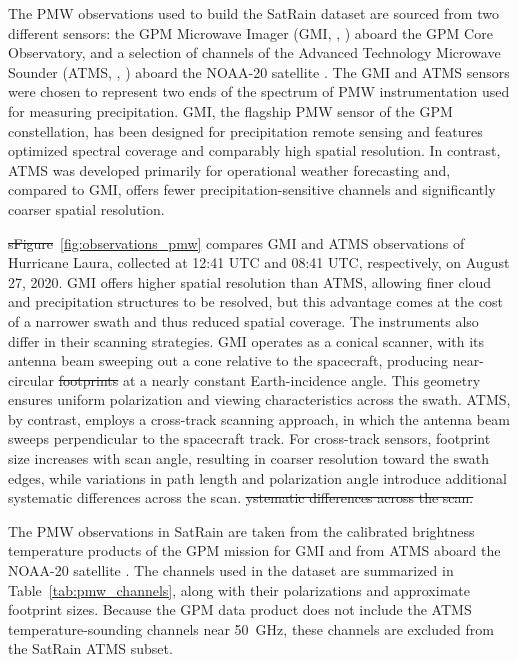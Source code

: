 \documentclass[11pt]{article}
\providecommand{\DIFadd}[1]{{\protect\color{blue}\uwave{#1}}} %
\providecommand{\DIFdel}[1]{{\protect\color{red}\sout{#1}}}                      %
\providecommand{\DIFaddbegin}{} %
\providecommand{\DIFaddend}{} %
\providecommand{\DIFdelbegin}{} %
\providecommand{\DIFdelend}{} %
\begin{document}
The PMW observations used to build the SatRain dataset are sourced from two
different sensors: the GPM Microwave Imager (GMI, \citeauthor{Draper2015GMI},
\citeyear{Draper2015GMI}) aboard the GPM Core Observatory, and a selection of
channels of the Advanced Technology Microwave Sounder (ATMS,
\citeauthor{Goldberg2006ATMS}, \citeyear{Goldberg2006ATMS}) aboard the NOAA-20
satellite \citep{Goldberg2013Joint}. The GMI and ATMS sensors were chosen to
represent two ends of the spectrum of PMW instrumentation used for measuring
precipitation. GMI, the flagship PMW sensor of the GPM constellation, has been
designed for precipitation remote sensing and features optimized spectral
coverage and comparably high spatial resolution. In contrast, ATMS was developed
primarily for operational weather forecasting and, compared to GMI, offers fewer
precipitation-sensitive channels and significantly coarser spatial resolution.

\DIFdelbegin \DIFdel{sFigure}\DIFdelend \DIFaddbegin \DIFadd{Figure}\DIFaddend ~\ref{fig:observations_pmw} compares GMI and ATMS observations of
Hurricane Laura, collected at 12:41 UTC and 08:41 UTC, respectively, on August
27, 2020. GMI offers higher spatial resolution than ATMS, allowing finer cloud
and precipitation structures to be resolved, but this advantage comes at the
cost of a narrower swath and thus reduced spatial coverage. The instruments also
differ in their scanning strategies. GMI operates as a conical scanner, with its
antenna beam sweeping out a cone relative to the spacecraft, producing
near-circular \DIFdelbegin \DIFdel{footprints }\DIFdelend \DIFaddbegin \DIFadd{scans on the surface }\DIFaddend at a nearly constant Earth-incidence angle. This
geometry ensures uniform polarization and viewing characteristics across the
swath. ATMS, by contrast, employs a cross-track scanning approach, in which the
antenna beam sweeps perpendicular to the spacecraft track. For cross-track
sensors, footprint size increases with scan angle, resulting in coarser
resolution toward the swath edges, while variations in path length and
polarization angle introduce additional systematic differences across the
scan.
\DIFdelbegin \DIFdel{ystematic differences across the scan.
}\DIFdelend 

The PMW observations in SatRain are taken from the calibrated brightness
temperature products of the GPM mission for GMI \citep{Berg2022_GMI_L1C_R_V07}
and from ATMS aboard the NOAA-20 satellite \citep{Berg2022_ATMS_NOAA20_1C_V07}.
The channels used in the dataset are summarized in Table~\ref{tab:pmw_channels},
along with their polarizations and approximate footprint sizes. Because the GPM
data product does not include the ATMS temperature-sounding channels near
\SI{50}{\giga\hertz}, these channels are excluded from the SatRain ATMS
subset.
\end{document}
